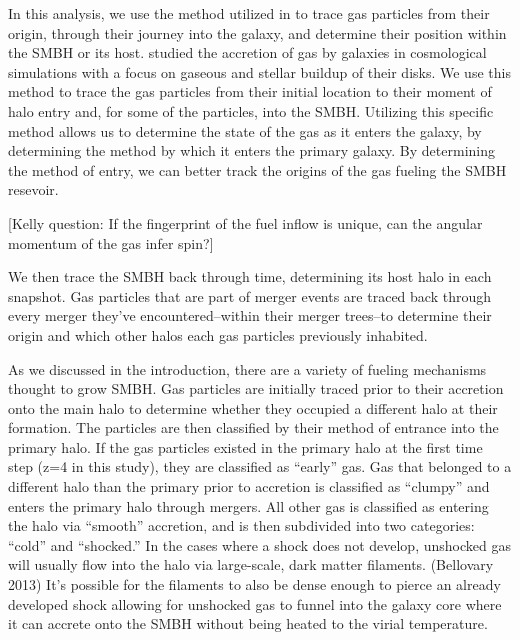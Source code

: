 \documentclass[manuscript]{aastex}
\begin{document}
In this analysis, we use the method utilized in \cite{Brooks2009} to trace gas particles from their origin, through their journey into the galaxy, and determine their position within the SMBH or its host. \cite{Brooks2009} studied the accretion of gas by galaxies in cosmological simulations with a focus on gaseous and stellar buildup of their disks. We use this method to trace the gas particles from their initial location to their moment of halo entry and, for some of the particles, into the SMBH. Utilizing this specific method allows us to determine the state of the gas as it enters the galaxy, by determining the method by which it enters the primary galaxy. By determining the method of entry, we can better track the origins of the gas fueling the SMBH resevoir. 
	
[Kelly question: If the fingerprint of the fuel inflow is unique, can the angular momentum of the gas infer spin?]
	
We then trace the SMBH back through time, determining its host halo in each snapshot. Gas particles that are part of merger events are traced back through every merger they've encountered--within their merger trees--to determine their origin and which other halos each gas particles previously inhabited.

As we discussed in the introduction, there are a variety of fueling mechanisms thought to grow SMBH. Gas particles are initially traced prior to their accretion onto the main halo to determine whether they occupied a different halo at their formation. The particles are then classified by their method of entrance into the primary halo. If the gas particles existed in the primary halo at the first time step (z=4 in this study), they are classified as ``early'' gas. Gas that belonged to a different halo than the primary prior to accretion is classified as ``clumpy'' and enters the primary halo through mergers. All other gas is classified as entering the halo via ``smooth'' accretion, and is then subdivided into two categories: ``cold'' and ``shocked.'' In the cases where a shock does not develop, unshocked gas will usually flow into the halo via large-scale, dark matter filaments. (Bellovary 2013) It's possible for the filaments to also be dense enough to pierce an already developed shock allowing for unshocked gas to funnel into the galaxy core where it can accrete onto the SMBH without being heated to the virial temperature.
\end{document}
